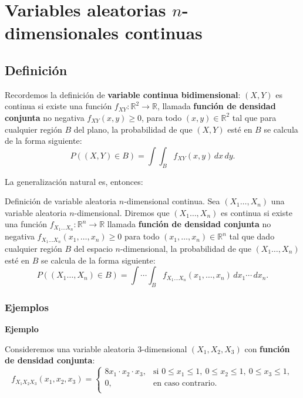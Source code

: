 \documentclass[]{book}
\begin{document}
\hypertarget{variables-aleatorias-n-dimensionales-continuas}{%
\section{\texorpdfstring{Variables aleatorias \(n\)-dimensionales continuas}{Variables aleatorias n-dimensionales continuas}}\label{variables-aleatorias-n-dimensionales-continuas}}

\hypertarget{definiciuxf3n-5}{%
\subsection{Definición}\label{definiciuxf3n-5}}

Recordemos la definición de \textbf{variable continua bidimensional}: \((X,Y)\) es continua si existe una función \(f_{XY}:\mathbb{R}^2\longrightarrow \mathbb{R}\), llamada \textbf{función de densidad conjunta} no negativa \(f_{XY}(x,y)\geq 0\), para todo \((x,y)\in\mathbb{R}^2\) tal que para cualquier región \(B\) del plano, la probabilidad de que \((X,Y)\) esté en \(B\) se calcula de la forma siguiente:
\[
P((X,Y)\in B)=\int\int_B f_{XY}(x,y)\,dx\, dy.
\]

La generalización natural es, entonces:

Definición de variable aleatoria \(n\)-dimensional continua.
Sea \((X_1\ldots,X_n)\) una variable aleatoria \(n\)-dimensional. Diremos que \((X_1\ldots,X_n)\) es continua si existe una función
\(f_{X_1\ldots X_n}:\mathbb{R}^n\longrightarrow \mathbb{R}\) llamada \textbf{función de densidad conjunta} no negativa \(f_{X_1\ldots X_n}(x_1,\ldots,x_n)\geq 0\) para todo \((x_1,\ldots,x_n)\in\mathbb{R}^n\) tal que dado cualquier región \(B\) del espacio \(n\)-dimensional, la probabilidad de que \((X_1\ldots,X_n)\) esté en \(B\) se calcula de la forma siguiente:
\[
P((X_1\ldots,X_n)\in B)=\int\cdots\int_B f_{X_1\ldots X_n}(x_1,\ldots,x_n)\,dx_1\cdots\,dx_n.
\]

\hypertarget{ejemplos-9}{%
\subsubsection{Ejemplos}\label{ejemplos-9}}

\textbf{Ejemplo}

Consideremos una variable aleatoria \(3\)-dimensional \((X_1,X_2,X_3)\) con \textbf{función de densidad conjunta}:
\[
f_{X_1X_2X_3}(x_1,x_2,x_3)=\begin{cases}
8 x_1\cdot x_2\cdot x_3, & \mbox{si }0\leq x_1\leq 1,\ 0\leq x_2\leq 1,\ 0\leq x_3\leq 1, \\
0, & \mbox{en caso contrario.}\\
\end{cases}
\]
\end{document}
